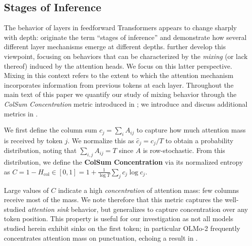 \subsection{Stages of Inference}\label{subsec:stages_of_inference_prelim}

The behavior of layers in feedforward Transformers appears to change sharply with depth: \citet{lad2024remarkable} originate the term ``stages of inference'' and demonstrate how several different layer mechanisms emerge at different depths. \citet{queipo2025attention} further develop this viewpoint, focusing on behaviors that can be characterized by the \emph{mixing} (or lack thereof) induced by the attention heads. We focus on this latter perspective.
Mixing in this context refers to the extent to which the attention mechanism incorporates information from previous tokens at each layer. Throughout the main text of this paper we quantify our study of mixing behavior through the \emph{ColSum Concentration} metric introduced in \citet{queipo2025attention}; we introduce and discuss additional metrics in .

We first define the column sum $c_j = \sum_i A_{ij}$ to capture how much attention mass is received by token $j$. We normalize this as $\hat{c}_j = c_j / T$ to obtain a probability distribution, noting that $\sum_{i,j} A_{ij} = T$ since $A$ is row-stochastic. From this distribution, we define the \textbf{ColSum Concentration} via its normalized entropy as
$C = 1 - H_{\text{col}} \in [0,1] = 1 + \frac{1}{\log T} \sum_j c_j \log c_j$.
 

Large values of $C$ indicate a high \emph{concentration} of attention mass: few columns receive most of the mass. We note therefore that this metric captures the well-studied \emph{attention sink} \citep{xiao2023efficient,barbero2025llms} behavior, but generalizes to capture concentration over any token position. This property is useful for our investigation as not all models studied herein exhibit sinks on the first token; in particular OLMo-2 frequently concentrates attention mass on punctuation, echoing a result in \citet{sandoval2025using}.